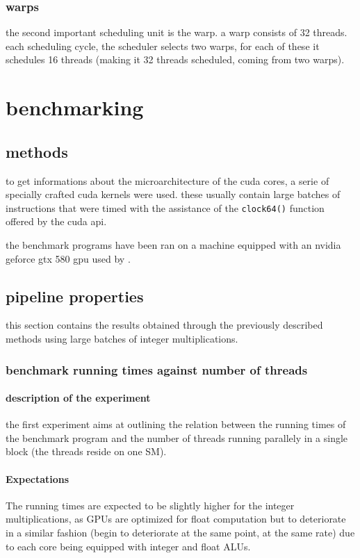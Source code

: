 \documentclass{report}
\begin{document}
        \subsection{warps}
        the second important scheduling unit is the warp. a warp consists
        of 32 threads. each scheduling cycle, the scheduler selects two
        warps, for each of these it schedules 16 threads (making it 32
        threads scheduled, coming from two warps)\cite{cudaprog}.

\chapter{benchmarking}

\section{methods}
	to get informations about the microarchitecture of the cuda cores, a serie 
    of specially crafted cuda kernels were used. these usually contain large 
    batches of instructions that were timed with the assistance of the \texttt{clock64()} 
    function offered by the cuda api.

	the benchmark programs have been ran on a machine equipped with an nvidia
    geforce gtx 580 gpu used by \cite{cofact14}.

\section{pipeline properties}
	this section contains the results obtained through the previously described
	methods using large batches of integer multiplications.

	\subsection{benchmark running times against number of threads}
	\label{par:pipeline_exp}
	\subsubsection{description of the experiment}
	the first experiment aims at outlining the relation between the running
    times of the benchmark program and the number of threads running parallely in
    a single block (the threads reside on one SM).
	\subsubsection{Expectations}
    The running times are expected to be slightly higher for the integer
    multiplications, as GPUs are optimized for float computation
    but to deteriorate in a similar fashion (begin to deteriorate
    at the same point, at the same rate) due to each core being equipped with
    integer and float ALUs.
    
\end{document}

